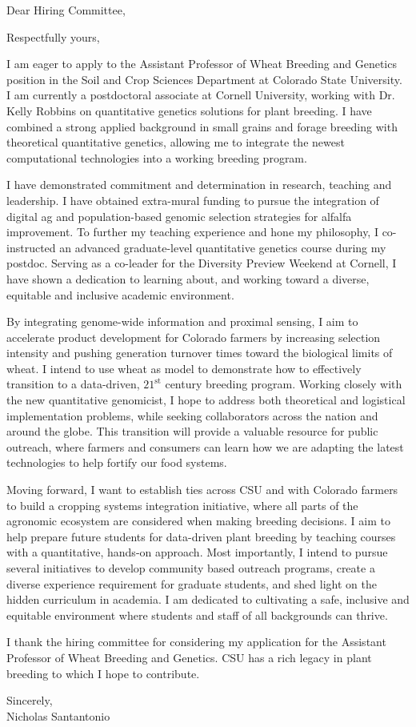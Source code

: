 \documentclass[11pt, letterpaper]{moderncv}
\begin{document}
\date{\today}
\opening{Dear Hiring Committee,}
\closing{Respectfully yours,}
\makelettertitle

I am eager to apply to the Assistant Professor of Wheat Breeding and Genetics position in the Soil and Crop Sciences Department at Colorado State University. I am currently a postdoctoral associate at Cornell University, working with Dr. Kelly Robbins on quantitative genetics solutions for plant breeding. I have combined a strong applied background in small grains and forage breeding with theoretical quantitative genetics, allowing me to integrate the newest computational technologies into a working breeding program.

I have demonstrated commitment and determination in research, teaching and leadership. I have obtained extra-mural funding to pursue the integration of digital ag and population-based genomic selection strategies for alfalfa improvement. To further my teaching experience and hone my philosophy, I co-instructed an advanced graduate-level quantitative genetics course during my postdoc. Serving as a co-leader for the Diversity Preview Weekend at Cornell, I have shown a dedication to learning about, and working toward a diverse, equitable and inclusive academic environment. 

By integrating genome-wide information and proximal sensing, I aim to accelerate product development for Colorado farmers by increasing selection intensity and pushing generation turnover times toward the biological limits of wheat. I intend to use wheat as model to demonstrate how to effectively transition to a data-driven, $21^\text{st}$ century breeding program. Working closely with the new quantitative genomicist, I hope to address both theoretical and logistical implementation problems, while seeking collaborators across the nation and around the globe. This transition will provide a valuable resource for public outreach, where farmers and consumers can learn how we are adapting the latest technologies to help fortify our food systems.

Moving forward, I want to establish ties across CSU and with Colorado farmers to build a cropping systems integration initiative, where all parts of the agronomic ecosystem are considered when making breeding decisions. I aim to help prepare future students for data-driven plant breeding by teaching courses with a quantitative, hands-on approach. Most importantly, I intend to pursue several initiatives to develop community based outreach programs, create a diverse experience requirement for graduate students, and shed light on the hidden curriculum in academia. I am dedicated to cultivating a safe, inclusive and equitable environment where students and staff of all backgrounds can thrive. 

I thank the hiring committee for considering my application for the Assistant Professor of Wheat Breeding and Genetics. CSU has a rich legacy in plant breeding to which I hope to contribute. 

\vspace{3mm}

Sincerely,\\
\vspace{2cm}
Nicholas Santantonio
\end{document}
